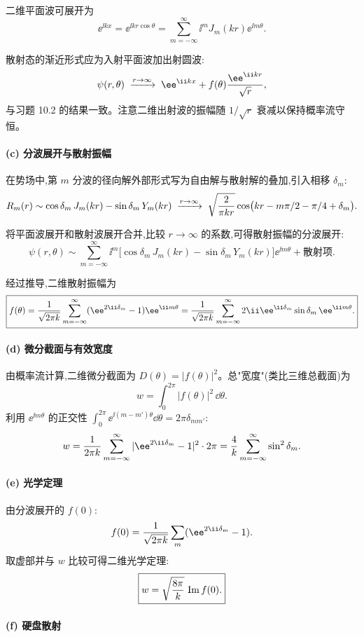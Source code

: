 \begin{question}
\begin{solution}
二维平面波可展开为
\[
\ee^{\ii kx}=\ee^{\ii kr\cos\theta}=\sum_{m=-\infty}^{\infty}\ii^m J_m(kr)\ee^{\ii m\theta}.
\]

散射态的渐近形式应为入射平面波加出射圆波:
\[
\psi(r,\theta)\;\xrightarrow{r\to\infty}\; \ee^{\ii kx}+f(\theta){\ee^{\ii kr}\over\sqrt r},
\]
与习题 10.2 的结果一致。注意二维出射波的振幅随 $1/\sqrt{r}$ 衰减以保持概率流守恒。

\paragraph{(c) 分波展开与散射振幅}

在势场中,第 $m$ 分波的径向解外部形式写为自由解与散射解的叠加,引入相移 $\delta_m$:
\[
R_m(r)\sim\cos\delta_m\,J_m(kr)-\sin\delta_m\,Y_m(kr)
\;\xrightarrow{r\to\infty}\;
\sqrt{2\over\pi kr}\cos\bigl(kr-m\pi/2-\pi/4+\delta_m\bigr).
\]

将平面波展开和散射波展开合并,比较 $r\to\infty$ 的系数,可得散射振幅的分波展开:
\[
\psi(r,\theta)\sim\sum_{m=-\infty}^{\infty}\ii^m\bigl[\cos\delta_m\,J_m(kr)-\sin\delta_m\,Y_m(kr)\bigr]\ee^{\ii m\theta}
+\text{散射项}.
\]

经过推导,二维散射振幅为
\[
\boxed{f(\theta)={1\over\sqrt{2\pi k}}\sum_{m=-\infty}^{\infty}(\ee^{2\ii\delta_m}-1)\ee^{\ii m\theta}
={1\over\sqrt{2\pi k}}\sum_{m=-\infty}^{\infty}2\ii \ee^{\ii\delta_m}\sin\delta_m\,\ee^{\ii m\theta}.}
\]

\paragraph{(d) 微分截面与有效宽度}

由概率流计算,二维微分截面为 $D(\theta)=|f(\theta)|^2$。总"宽度"(类比三维总截面)为
\[
w=\int_0^{2\pi}|f(\theta)|^2\,\dd\theta.
\]
利用 $\ee^{\ii m\theta}$ 的正交性 $\int_0^{2\pi}\ee^{\ii(m-m')\theta}\dd\theta=2\pi\delta_{mm'}$:
\[
w={1\over2\pi k}\sum_{m=-\infty}^{\infty}|\ee^{2\ii\delta_m}-1|^2\cdot2\pi
={4\over k}\sum_{m=-\infty}^{\infty}\sin^2\delta_m.
\]

\paragraph{(e) 光学定理}

由分波展开的 $f(0)$:
\[
f(0)={1\over\sqrt{2\pi k}}\sum_m(\ee^{2\ii\delta_m}-1).
\]
取虚部并与 $w$ 比较可得二维光学定理:
\[
\boxed{w=\sqrt{8\pi\over k}\,\operatorname{Im}f(0).}
\]

\paragraph{(f) 硬盘散射}


\end{solution}
\end{question}
